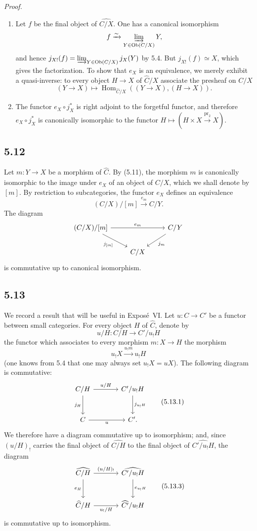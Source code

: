 \documentclass[11pt]{article}
\newcommand{\Ob}{\operatorname{Ob}}
\newcommand{\Hom}{\operatorname{Hom}}
\newcommand{\pr}{\operatorname{pr}}
\newenvironment{proofsketch}{\par\noindent\emph{Proof.}\ }{\par\medskip}
\begin{document}
\begin{proofsketch}
\begin{enumerate}[label=\arabic*)]
\item Let $f$ be the final object of $\widehat{C/X}$. One has a canonical isomorphism
\[
f\xrightarrow{\sim}\varinjlim_{Y\in\Ob(C/X)}Y,
\]
and hence $j_{X!}(f)=\varinjlim_{Y\in\Ob(C/X)}j_X(Y)$ by 5.4. But $j_{X!}(f)\simeq X$, which gives the factorization. To show that $e_X$ is an equivalence, we merely exhibit a quasi-inverse: to every object $H\to X$ of $\widehat C/X$ associate the presheaf on $C/X$
\[
(Y\to X)\longmapsto \Hom_{\widehat C/X}((Y\to X),(H\to X)).
\]
\item The functor $e_X\circ j_X^*$ is right adjoint to the forgetful functor, and therefore $e_X\circ j_X^*$ is canonically isomorphic to the functor $H\mapsto (H\times X\xrightarrow{\pr_2}X)$.
\end{enumerate}
\end{proofsketch}

\subsection*{5.12}
Let $m:Y\to X$ be a morphism of $\widehat C$. By (5.11), the morphism $m$ is canonically isomorphic to the image under $e_X$ of an object of $\widehat{C/X}$, which we shall denote by $[m]$. By restriction to subcategories, the functor $e_X$ defines an equivalence
\[
(C/X)/[m]\xrightarrow{e_m}C/Y.
\]
The diagram
\[
\begin{tikzcd}
(C/X)/[m]\arrow[rr,"e_m"]\arrow[dr,"j_{[m]}"']&&C/Y\arrow[dl,"j_m"]\\
&C/X&
\end{tikzcd}
\]
is commutative up to canonical isomorphism.

\subsection*{5.13}
We record a result that will be useful in Expos\'e~VI. Let $u:C\to C'$ be a functor between small categories. For every object $H$ of $\widehat C$, denote by
\[
u/H:C/H\longrightarrow C'/u_!H
\]
the functor which associates to every morphism $m:X\to H$ the morphism
\[
u_!X\xrightarrow{u_!m}u_!H
\]
(one knows from 5.4 that one may always set $u_!X=uX$). The following diagram is commutative:
\[
\begin{tikzcd}[column sep=large,row sep=large]
C/H\arrow[r,"u/H"]\arrow[d,"j_H"']&C'/u_!H\arrow[d,"j_{u_!H}"]\\
C\arrow[r,"u"']&C'.
\end{tikzcd}
\tag{5.13.1}
\]
We therefore have a diagram commutative up to isomorphism; and, since $(u/H)_!$ carries the final object of $\widehat{C/H}$ to the final object of $\widehat{C'/u_!H}$, the diagram
\[
\begin{tikzcd}[column sep=large,row sep=large]
\widehat{C/H}\arrow[r,"(u/H)_!"]\arrow[d,"e_H"']&\widehat{C'/u_!H}\arrow[d,"e_{u_!H}"]\\
\widehat C/H\arrow[r,"u_!/H"']&\widehat{C'}/u_!H
\end{tikzcd}
\tag{5.13.3}
\]
is commutative up to isomorphism.
\end{document}
